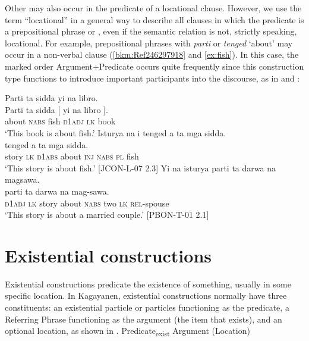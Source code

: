 Other  may also occur in the predicate of a locational clause. However, we use the term “locational” in a general way to describe all clauses in which the predicate is a prepositional phrase or , even if the semantic relation is not, strictly speaking, locational. For example, prepositional phrases with \textit{parti} or \textit{tenged} ‘about’ may occur in a non-verbal clause (\ref{bkm:Ref246297918} and \ref{ex:fish}). In this case, the marked order Argument+Predicate occurs quite frequently since this construction type functions to introduce important participants into the discourse, as in  and :

\ea
\label{bkm:Ref246297918}
Parti  ta  sidda  yi  na  libro. \\\smallskip
\gll Parti  ta  sidda  [ yi  na  libro{ }]. \\
about  \textsc{nabs}  fish  {} \textsc{d1adj}  \textsc{lk}  book \\
\glt ‘This book is about fish.’
\z
\ea
\label{ex:fish}
Isturya  na  i  tenged  a  ta  mga  sidda. \\\smallskip
\gll [ Isturya  na  i{ }] tenged  a  ta  mga  sidda. \\
 {} story  \textsc{lk} \textsc{d1abs} about  \textsc{inj}  \textsc{nabs}  \textsc{pl}  fish \\
\glt ‘This story is about fish.’ [JCON-L-07 2.3]
\z
\ea
\label{bkm:Ref429136467}
Yi  na  isturya  parti  ta  darwa  na  magsawa. \\\smallskip
\gll [ Yi  na  isturya ] parti  ta  darwa  na  mag-sawa. \\
{} \textsc{d1adj}  \textsc{lk}  story {} about  \textsc{nabs}  two  \textsc{lk}  \textsc{rel}-spouse \\
\glt ‘This story is about a married couple.’ [PBON-T-01 2.1]
\z
\section{Existential constructions}
\label{sec:existentialconstructions} 

Existential constructions predicate the existence of something, usually in some specific location. In Kagayanen, existential constructions normally have three constituents: an existential particle or particles functioning as the predicate, a Referring Phrase functioning as the argument (the item that exists), and an optional location, as shown in . 
\ea
\label{ex:existentialtemplate}
Predicate\textsubscript{exist}  Argument  (Location)
\z


